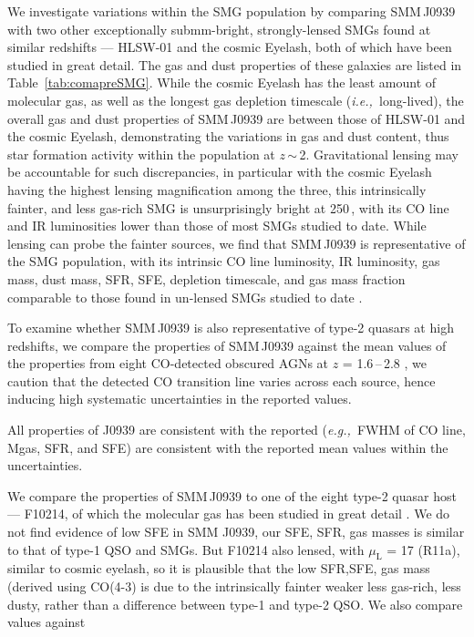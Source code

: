 \documentclass[twocolumn,apj,numberedappendix]{emulateapj}
\newcommand{\eg}{{\sl e.g.,~}}
\newcommand{\ie}{{\sl i.e.,~}}
\begin{document}

We investigate variations within the SMG population by comparing SMM\,J0939 with two other exceptionally submm-bright, 
strongly-lensed SMGs
found at similar redshifts --- HLSW-01 and the cosmic Eyelash, both of which have been studied in great detail. The gas and dust properties 
of these galaxies are listed in Table~\ref{tab:comapreSMG}. While the cosmic Eyelash has the least amount of molecular gas, as well as 
the 
longest gas depletion timescale (\ie long-lived), the overall gas and dust properties of SMM\,J0939 are between those of HLSW-01 and the 
cosmic
Eyelash, demonstrating the variations in gas and dust content, thus star formation activity within the population at $z$\,$\sim$\,2. 
Gravitational 
lensing may be accountable for such discrepancies, in particular with the cosmic Eyelash having the highest lensing magnification among the 
three, this
intrinsically fainter, and less gas-rich SMG is unsurprisingly bright 
at 250\,\micron, with its CO line and IR luminosities lower than those of most SMGs studied to date. While lensing can probe the fainter 
sources, we find that SMM\,J0939 is representative of the SMG population, with its intrinsic CO line luminosity, IR luminosity, gas mass, 
dust mass, SFR, SFE, depletion timescale, and gas mass fraction comparable to those found in un-lensed SMGs studied to date 
\citep{Greve05a}.

To examine whether SMM\,J0939 is also representative of type-2 quasars at high redshifts, we compare the properties of SMM\,J0939 
against 
the mean values of the properties from eight CO-detected obscured AGNs at $z$ = 1.6\,--\,2.8 \citep[][and references therein]{Polletta11a}, 
we caution that the detected CO 
transition line varies across each source, hence inducing high systematic uncertainties in the reported values. 

All properties of J0939 are consistent with the reported (\eg FWHM of CO line, Mgas, SFR, and SFE) are consistent with the reported mean values within the uncertainties.


We compare the properties of SMM\,J0939 to one of the eight type-2 quasar host --- F10214, of which the molecular gas has been studied 
in great detail \citep{Riechers11a,Solomon05a}. We do not find evidence of low SFE in SMM J0939, our SFE, SFR, gas masses is similar to 
that of type-1 QSO and SMGs. But F10214 also lensed, with $\mu_\textrm{L}$ = 17 (R11a), similar to cosmic eyelash, so it is plausible 
that the low SFR,SFE, gas mass (derived using CO(4-3) is due to the intrinsically fainter weaker less gas-rich, less dusty, rather than a 
difference between type-1 and type-2 QSO.
We also compare values against
\end{document}
